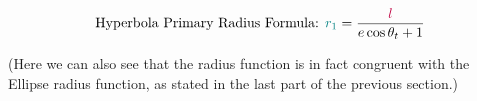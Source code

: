 $$\text{Hyperbola Primary Radius Formula: }\textcolor{teal}{r_1} = \frac{\textcolor{purple}{l}}{\textcolor{black}{e}\cos{\textcolor{black}{\theta_t}} + 1}$$

(Here we can also see that the radius function is in fact congruent with the Ellipse radius function, as stated in the last part of the previous section.)
